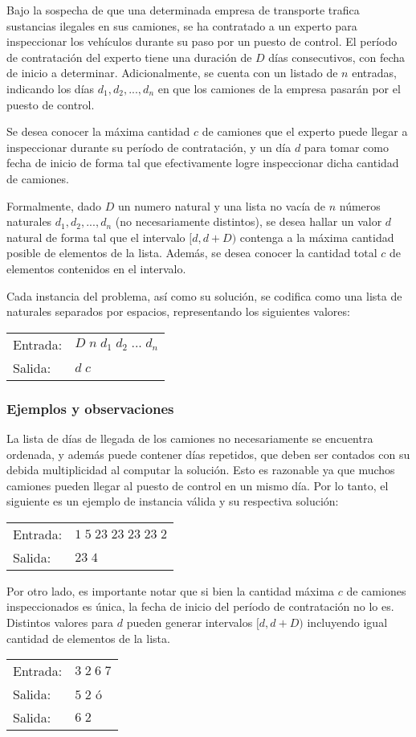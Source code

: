 Bajo la sospecha de que una determinada empresa de transporte trafica sustancias ilegales en sus camiones, se ha contratado a un experto para inspeccionar los vehículos durante su paso por un puesto de control. El período de contratación del experto tiene una duración de $D$ días consecutivos, con fecha de inicio a determinar. Adicionalmente, se cuenta con un listado de $n$ entradas, indicando los días $d_1, d_2, ..., d_n$ en que los camiones de la empresa pasarán por el puesto de control.

Se desea conocer la máxima cantidad $c$ de camiones que el experto puede llegar a inspeccionar durante su período de contratación, y un día $d$ para tomar como fecha de inicio de forma tal que efectivamente logre inspeccionar dicha cantidad de camiones.

Formalmente, dado $D$ un numero natural y una lista no vacía de $n$ números naturales $d_1, d_2, ..., d_n$ (no necesariamente distintos), se desea hallar un valor $d$ natural de forma tal que el intervalo $[d, d + D)$ contenga a la máxima cantidad posible de elementos de la lista. Además, se desea conocer la cantidad total $c$ de elementos contenidos en el intervalo.

Cada instancia del problema, así como su solución, se codifica como una lista de naturales separados por espacios, representando los siguientes valores:

\begin{tabular}{ll}
Entrada: &$D\;n\;d_1\;d_2\;...\;d_n$ \\
Salida:  &$d\;c$
\end{tabular}

\subsubsection{Ejemplos y observaciones}

La lista de días de llegada de los camiones no necesariamente se encuentra ordenada, y además puede contener días repetidos, que deben ser contados con su debida multiplicidad al computar la solución. Esto es razonable ya que muchos camiones pueden llegar al puesto de control en un mismo día. Por lo tanto, el siguiente es un ejemplo de instancia válida y su respectiva solución:

\begin{tabular}{ll}
Entrada: &$1\;5\;23\;23\;23\;23\;2$            \\
Salida:  &$23\;4$ \hspace{10mm}
\end{tabular}

Por otro lado, es importante notar que si bien la cantidad máxima $c$ de camiones inspeccionados es única, la fecha de inicio del período de contratación no lo es. Distintos valores para $d$ pueden generar intervalos $[d, d + D)$ incluyendo igual cantidad de elementos de la lista.

\begin{tabular}{ll}
Entrada: &$3\;2\;6\;7$            \\
Salida:  &$5\;2$ \hspace{10mm} ó  \\
Salida:  &$6\;2$ \hspace{10mm}
\end{tabular}